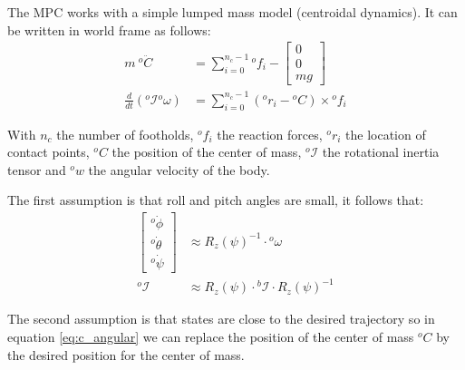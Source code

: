 \documentclass[a4paper,11pt]{article}
\begin{document}
The MPC works with a simple lumped mass model (centroidal dynamics). It can be written in world frame as follows:
\begin{align}
	m ~ {}^o\!  \ddot C &= \sum_{i=0}^{n_c - 1} {}^o\!f_i - \begin{bmatrix} 0 \\ 0 \\ mg \end{bmatrix} \label{eq:c_linear}\\
	\frac{d}{dt}({}^o\!\mathcal{I} {}^o\!\omega) &= \sum_{i=0}^{n_c - 1} ({}^o\!r_i - {}^o\!C) \times {}^o\!f_i \label{eq:c_angular}
\end{align}

With $n_c$ the number of footholds, ${}^o\!f_i$ the reaction forces, ${}^o\!r_i$ the location of contact points, ${}^o\!C$ the position of the center of mass, ${}^o\!\mathcal{I}$ the rotational inertia tensor and ${}^o\!w$ the angular velocity of the body.

The first assumption is that roll and pitch angles are small, it follows that:
\begin{align}
\begin{bmatrix} {}^o\! \dot \phi \\ {}^o\! \dot \theta \\ {}^o\! \dot \psi \end{bmatrix} &\approx R_z(\psi)^{-1} \cdot {}^o\!\omega \label{eq:assumption1} \\ 
{}^o\! \mathcal{I} &\approx R_z(\psi) \cdot {}^b\! \mathcal{I} \cdot R_z(\psi)^{-1} 
\end{align}

The second assumption is that states are close to the desired trajectory so in equation \ref{eq:c_angular} we can replace the position of the center of mass ${}^o\!C$ by the desired position for the center of mass.
\end{document}
